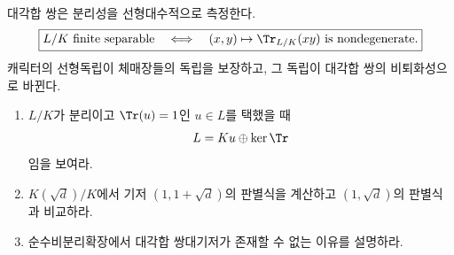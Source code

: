 \begin{keyidea}
대각합 쌍은 분리성을 선형대수적으로 측정한다.
\[
  \boxed{
  L/K\text{ finite separable}
  \quad\Longleftrightarrow\quad
  (x,y)\mapsto\Tr_{L/K}(xy)\text{ is nondegenerate}.}
\]
캐릭터의 선형독립이 체매장들의 독립을 보장하고, 그 독립이 대각합 쌍의 비퇴화성으로 바뀐다.
\end{keyidea}

\begin{checkpoint}
\begin{enumerate}[label=(\alph*)]
  \item $L/K$가 분리이고 $\Tr(u)=1$인 $u\in L$를 택했을 때
  \[
    L=Ku\oplus\ker\Tr
  \]
  임을 보여라.
  \item $K(\sqrt d)/K$에서 기저 $(1,1+\sqrt d)$의 판별식을 계산하고 $(1,\sqrt d)$의 판별식과 비교하라.
  \item 순수비분리확장에서 대각합 쌍대기저가 존재할 수 없는 이유를 설명하라.
\end{enumerate}
\end{checkpoint}
